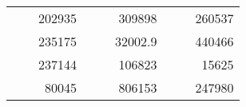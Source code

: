 \begin{table}[H]
\begin{tabular}{|ccrccrccc}
\rowcolor[HTML]{DAE8FC} 
\multicolumn{1}{|c|}{\cellcolor[HTML]{FFFFC7}}                                & \multicolumn{1}{c|}{\cellcolor[HTML]{DAE8FC}}                      & \multicolumn{1}{r|}{\cellcolor[HTML]{DAE8FC}202935}    & \multicolumn{1}{c|}{\cellcolor[HTML]{FFFFC7}}                                & \multicolumn{1}{c|}{\cellcolor[HTML]{DAE8FC}}                       & \multicolumn{1}{r|}{\cellcolor[HTML]{DAE8FC}309898}    & \multicolumn{1}{c|}{\cellcolor[HTML]{FFFFC7}}                                & \multicolumn{1}{c|}{\cellcolor[HTML]{DAE8FC}}                      & \multicolumn{1}{r|}{\cellcolor[HTML]{DAE8FC}260537}    \\ \cline{3-3} \cline{6-6} \cline{9-9} 
\multicolumn{1}{|c|}{\cellcolor[HTML]{FFFFC7}}                                & \multicolumn{1}{c|}{\cellcolor[HTML]{DAE8FC}}                      & \multicolumn{1}{r|}{\cellcolor[HTML]{DDFDFF}235175}    & \multicolumn{1}{c|}{\cellcolor[HTML]{FFFFC7}}                                & \multicolumn{1}{c|}{\cellcolor[HTML]{DAE8FC}}                       & \multicolumn{1}{r|}{\cellcolor[HTML]{DDFDFF}32002.9}   & \multicolumn{1}{c|}{\cellcolor[HTML]{FFFFC7}}                                & \multicolumn{1}{c|}{\cellcolor[HTML]{DAE8FC}}                      & \multicolumn{1}{r|}{\cellcolor[HTML]{DDFDFF}440466}    \\ \cline{3-3} \cline{6-6} \cline{9-9} 
\rowcolor[HTML]{DAE8FC} 
\multicolumn{1}{|c|}{\cellcolor[HTML]{FFFFC7}}                                & \multicolumn{1}{c|}{\cellcolor[HTML]{DAE8FC}}                      & \multicolumn{1}{r|}{\cellcolor[HTML]{DAE8FC}237144}    & \multicolumn{1}{c|}{\cellcolor[HTML]{FFFFC7}}                                & \multicolumn{1}{c|}{\cellcolor[HTML]{DAE8FC}}                       & \multicolumn{1}{r|}{\cellcolor[HTML]{DAE8FC}106823}    & \multicolumn{1}{c|}{\cellcolor[HTML]{FFFFC7}}                                & \multicolumn{1}{c|}{\cellcolor[HTML]{DAE8FC}}                      & \multicolumn{1}{r|}{\cellcolor[HTML]{DAE8FC}15625}     \\ \cline{3-3} \cline{6-6} \cline{9-9} 
\multicolumn{1}{|c|}{\cellcolor[HTML]{FFFFC7}}                                & \multicolumn{1}{c|}{\cellcolor[HTML]{DAE8FC}}                      & \multicolumn{1}{r|}{\cellcolor[HTML]{DDFDFF}80045}     & \multicolumn{1}{c|}{\cellcolor[HTML]{FFFFC7}}                                & \multicolumn{1}{c|}{\cellcolor[HTML]{DAE8FC}}                       & \multicolumn{1}{r|}{\cellcolor[HTML]{DDFDFF}806153}    & \multicolumn{1}{c|}{\cellcolor[HTML]{FFFFC7}}                                & \multicolumn{1}{c|}{\cellcolor[HTML]{DAE8FC}}                      & \multicolumn{1}{r|}{\cellcolor[HTML]{DDFDFF}247980}    \\ \cline{3-3} \cline{6-6} \cline{9-9} 

\end{tabular}
\end{table}
